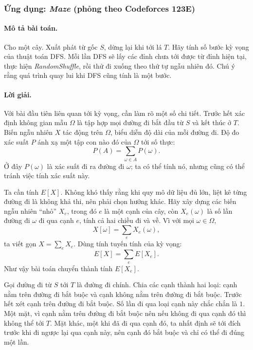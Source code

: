 \documentclass[11pt]{article}
\begin{document}
\subsubsection{Ứng dụng: \emph{Maze} (phỏng theo Codeforces 123E)}

\paragraph{Mô tả bài toán.}
Cho một cây. Xuất phát từ gốc \(S\), dừng lại khi tới lá \(T\). Hãy tính số
bước kỳ vọng của thuật toán DFS. Mỗi lần DFS sẽ lấy các đỉnh chưa tới được từ
đỉnh hiện tại, thực hiện \emph{RandomShuffle}, rồi thử đi xuống theo thứ tự
ngẫu nhiên đó. Chú ý rằng quá trình quay lui khi DFS cũng tính là một bước.

\paragraph{Lời giải.}
Với bài đầu tiên liên quan tới kỳ vọng, cần làm rõ một số chi tiết. Trước hết
xác định không gian mẫu \(\Omega\) là tập hợp mọi đường đi bắt đầu từ \(S\)
và kết thúc ở \(T\). Biến ngẫu nhiên \(X\) tác động trên \(\Omega\), biểu
diễn độ dài của mỗi đường đi. Độ đo xác suất \(P\) ánh xạ một tập con nào đó
của \(\Omega\) tới số thực:
\[
  P(A)=\sum_{\omega\in A}P(\omega).
\]
Ở đây \(P(\omega)\) là xác suất đi ra đường đi \(\omega\); ta có thể tính
nó, nhưng cũng có thể tránh việc tính xác suất này.

Ta cần tính \(E[X]\). Không khó thấy rằng khi quy mô dữ liệu đủ lớn, liệt kê
từng đường đi là không khả thi, nên phải chọn hướng khác. Hãy xây dựng các
biến ngẫu nhiên ``nhỏ'' \(X_e\), trong đó \(e\) là một cạnh của cây, còn
\(X_e(\omega)\) là số lần đường đi \(\omega\) đi qua cạnh \(e\), tính cả hai
chiều đi và về. Vì với mọi \(\omega\in\Omega\),
\[
  X[\omega]=\sum_e X_e(\omega),
\]
ta viết gọn \(X=\sum_e X_e\). Dùng tính tuyến tính của kỳ vọng:
\[
  E[X]=\sum_e E[X_e].
\]
Như vậy bài toán chuyển thành tính \(E[X_e]\).

Gọi đường đi từ \(S\) tới \(T\) là đường đi chính. Chia các cạnh thành hai
loại: cạnh nằm trên đường đi bắt buộc và cạnh không nằm trên đường đi bắt
buộc. Trước hết xét cạnh trên đường đi bắt buộc. Số lần đi qua loại cạnh này
chắc chắn là \(1\). Một mặt, vì cạnh nằm trên đường đi bắt buộc nên nếu
không đi qua cạnh đó thì không thể tới \(T\). Mặt khác, một khi đã đi qua
cạnh đó, ta nhất định sẽ tới đích trước khi đi ngược lại qua cạnh này, nên
cạnh đó bắt buộc và chỉ có thể đi đúng một lần.
\end{document}
